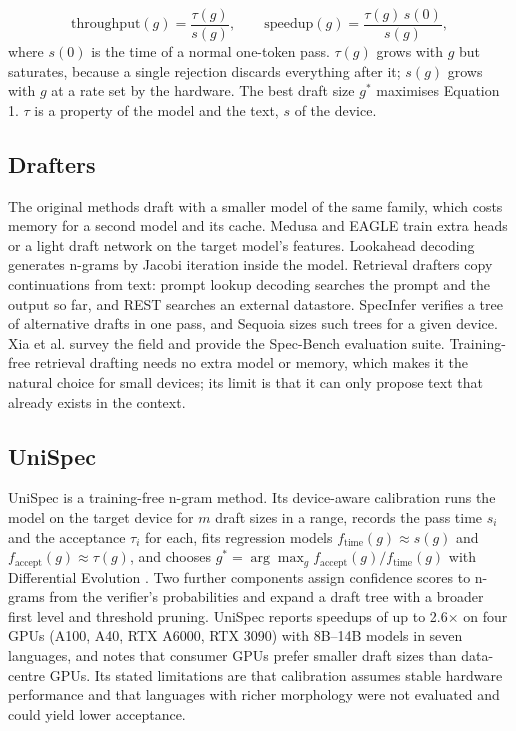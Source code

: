 \documentclass[11pt,a4paper]{article}
\begin{document}
\begin{equation}
\mathrm{throughput}(g)=\frac{\tau(g)}{s(g)},\qquad \mathrm{speedup}(g)=\frac{\tau(g)\,s(0)}{s(g)},
\end{equation}
where $s(0)$ is the time of a normal one-token pass. $\tau(g)$ grows with $g$ but saturates, because a single rejection discards everything after it; $s(g)$ grows with $g$ at a rate set by the hardware. The best draft size $g^*$ maximises Equation 1. $\tau$ is a property of the model and the text, $s$ of the device.

\subsection{Drafters}
The original methods \cite{leviathan,chen} draft with a smaller model of the same family, which costs memory for a second model and its cache. Medusa \cite{medusa} and EAGLE \cite{eagle} train extra heads or a light draft network on the target model's features. Lookahead decoding \cite{lookahead} generates n-grams by Jacobi iteration inside the model. Retrieval drafters copy continuations from text: prompt lookup decoding \cite{pld} searches the prompt and the output so far, and REST \cite{rest} searches an external datastore. SpecInfer \cite{specinfer} verifies a tree of alternative drafts in one pass, and Sequoia \cite{sequoia} sizes such trees for a given device. Xia et al. \cite{specbench} survey the field and provide the Spec-Bench evaluation suite. Training-free retrieval drafting needs no extra model or memory, which makes it the natural choice for small devices; its limit is that it can only propose text that already exists in the context.

\subsection{UniSpec}
UniSpec \cite{unispec} is a training-free n-gram method. Its device-aware calibration runs the model on the target device for $m$ draft sizes in a range, records the pass time $s_i$ and the acceptance $\tau_i$ for each, fits regression models $f_{\mathrm{time}}(g) \approx s(g)$ and $f_{\mathrm{accept}}(g) \approx \tau(g)$, and chooses $g^* = \arg\max_g f_{\mathrm{accept}}(g)/f_{\mathrm{time}}(g)$ with Differential Evolution \cite{de}. Two further components assign confidence scores to n-grams from the verifier's probabilities and expand a draft tree with a broader first level and threshold pruning. UniSpec reports speedups of up to 2.6$\times$ on four GPUs (A100, A40, RTX A6000, RTX 3090) with 8B--14B models in seven languages, and notes that consumer GPUs prefer smaller draft sizes than data-centre GPUs. Its stated limitations are that calibration assumes stable hardware performance and that languages with richer morphology were not evaluated and could yield lower acceptance.
\end{document}

